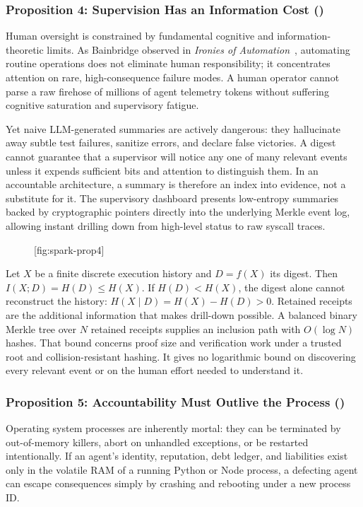 \subsubsection*{Proposition 4: Supervision Has an Information Cost ()}
Human oversight is constrained by fundamental cognitive and information-theoretic limits. As Bainbridge observed in \emph{Ironies of Automation}~, automating routine operations does not eliminate human responsibility; it concentrates attention on rare, high-consequence failure modes. A human operator cannot parse a raw firehose of millions of agent telemetry tokens without suffering cognitive saturation and supervisory fatigue.

Yet naive LLM-generated summaries are actively dangerous: they hallucinate away subtle test failures, sanitize errors, and declare false victories. A digest cannot guarantee that a supervisor will notice any one of many relevant events unless it expends sufficient bits and attention to distinguish them. In an accountable architecture, a summary is therefore an index into evidence, not a substitute for it. The supervisory dashboard presents low-entropy summaries backed by cryptographic pointers directly into the underlying Merkle event log, allowing instant drilling down from high-level status to raw syscall traces.

\begin{figure}[tp]
  \centering
  [fig:spark-prop4]
\end{figure}

Let $X$ be a finite discrete execution history and $D=f(X)$ its digest. Then $I(X;D)=H(D)\le H(X)$. If $H(D)<H(X)$, the digest alone cannot reconstruct the history: $H(X\mid D)=H(X)-H(D)>0$. Retained receipts are the additional information that makes drill-down possible. A balanced binary Merkle tree over $N$ retained receipts supplies an inclusion path with $O(\log N)$ hashes. That bound concerns proof size and verification work under a trusted root and collision-resistant hashing. It gives no logarithmic bound on discovering every relevant event or on the human effort needed to understand it.

\subsubsection*{Proposition 5: Accountability Must Outlive the Process ()}
Operating system processes are inherently mortal: they can be terminated by out-of-memory killers, abort on unhandled exceptions, or be restarted intentionally. If an agent's identity, reputation, debt ledger, and liabilities exist only in the volatile RAM of a running Python or Node process, a defecting agent can escape consequences simply by crashing and rebooting under a new process ID.

